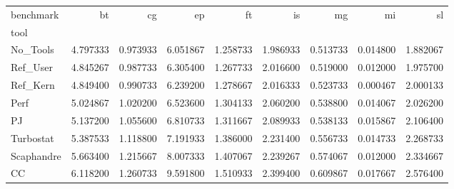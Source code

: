 \begin{tabular}{lrrrrrrrr}
\toprule
benchmark & bt & cg & ep & ft & is & mg & mi & sl \\
tool &  &  &  &  &  &  &  &  \\
\midrule
No_Tools & 4.797333 & 0.973933 & 6.051867 & 1.258733 & 1.986933 & 0.513733 & 0.014800 & 1.882067 \\
Ref_User & 4.845267 & 0.987733 & 6.305400 & 1.267733 & 2.016600 & 0.519000 & 0.012000 & 1.975700 \\
Ref_Kern & 4.849400 & 0.990733 & 6.239200 & 1.278667 & 2.016333 & 0.523733 & 0.000467 & 2.000133 \\
Perf & 5.024867 & 1.020200 & 6.523600 & 1.304133 & 2.060200 & 0.538800 & 0.014067 & 2.026200 \\
PJ & 5.137200 & 1.055600 & 6.810733 & 1.311667 & 2.089933 & 0.538133 & 0.015867 & 2.106400 \\
Turbostat & 5.387533 & 1.118800 & 7.191933 & 1.386000 & 2.231400 & 0.556733 & 0.014733 & 2.268733 \\
Scaphandre & 5.663400 & 1.215667 & 8.007333 & 1.407067 & 2.239267 & 0.574067 & 0.012000 & 2.334667 \\
CC & 6.118200 & 1.260733 & 9.591800 & 1.510933 & 2.399400 & 0.609867 & 0.017667 & 2.576400 \\
\bottomrule
\end{tabular}
